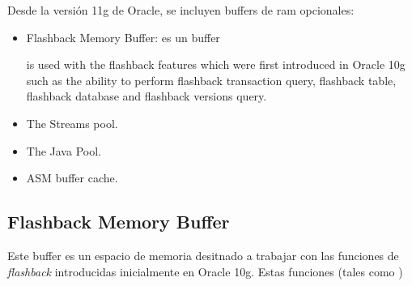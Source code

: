 Desde la versión 11g de Oracle, se incluyen buffers de ram opcionales:
\begin{itemize}
	\item Flashback Memory Buffer: es un buffer 
	
	is used with the flashback features which were first introduced in Oracle 10g such as the ability to perform flashback transaction query, flashback table, flashback database and flashback versions query.
	
	
	\item The Streams pool.
	\item The Java Pool.
	\item ASM buffer cache.
\end{itemize}

\subsection{Flashback Memory Buffer}
Este buffer es un espacio de memoria desitnado a trabajar con las funciones de \emph{flashback} introducidas inicialmente en Oracle 10g. Estas funciones (tales como )

